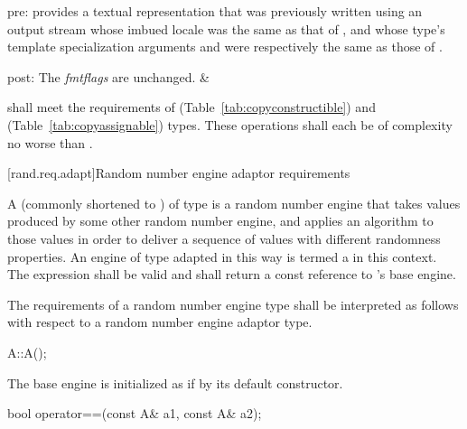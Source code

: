 \begin{libreqtab4d}
    pre:
     provides a textual representation
    that was previously written
    using an output stream
    whose imbued locale
    was the same as that of ,
    and whose type's template specialization arguments
     and 
    were respectively the same as those of .

    post: The \textit{fmtflags} are unchanged.
  & 
  \\
\end{libreqtab4d}

\pnum
{} shall meet the requirements
of  (Table~\ref{tab:copyconstructible})
and  (Table~\ref{tab:copyassignable}) types.
These operations shall each be of complexity
no worse than .


%



[rand.req.adapt]{Random number engine adaptor requirements}%

\pnum
A 
(commonly shortened to )
 of type 
is a random number engine
that takes values
produced by some other random number engine,
and applies an algorithm to those values
in order to deliver a sequence of values
with different randomness properties.
An engine  of type  adapted in this way
is termed a 
in this context.
The expression  shall be valid and shall return a
const reference to 's base engine.

\pnum
The requirements of a random number engine type
shall be interpreted as follows
with respect to a random number engine adaptor type.

\begin{itemdecl}
A::A();
\end{itemdecl}

\begin{itemdescr}
\pnum\effects
 The base engine is initialized
 as if by its default constructor.
\end{itemdescr}

\begin{itemdecl}
bool operator==(const A& a1, const A& a2);
\end{itemdecl}

